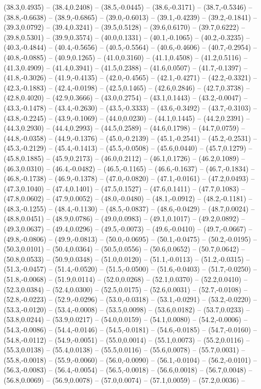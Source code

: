 \documentclass{SVnote}
\begin{document}
(38.3,0.4935) -- (38.4,0.2408) -- (38.5,-0.0445) -- (38.6,-0.3171) -- (38.7,-0.5346) -- (38.8,-0.6638) -- (38.9,-0.6865) -- (39.0,-0.6013) -- (39.1,-0.4239) -- (39.2,-0.1841) -- (39.3,0.0792) -- (39.4,0.3241) -- (39.5,0.5128) -- (39.6,0.6170) -- (39.7,0.6222) -- (39.8,0.5301) -- (39.9,0.3574) -- (40.0,0.1331) -- (40.1,-0.1065) -- (40.2,-0.3235) -- (40.3,-0.4844) -- (40.4,-0.5656) -- (40.5,-0.5564) -- (40.6,-0.4606) -- (40.7,-0.2954) -- (40.8,-0.0885) -- (40.9,0.1265) -- (41.0,0.3160) -- (41.1,0.4508) -- (41.2,0.5116) -- (41.3,0.4909) -- (41.4,0.3941) -- (41.5,0.2388) -- (41.6,0.0507) -- (41.7,-0.1397) -- (41.8,-0.3026) -- (41.9,-0.4135) -- (42.0,-0.4565) -- (42.1,-0.4271) -- (42.2,-0.3321) -- (42.3,-0.1883) -- (42.4,-0.0198) -- (42.5,0.1465) -- (42.6,0.2846) -- (42.7,0.3738) -- (42.8,0.4020) -- (42.9,0.3666) -- (43.0,0.2754) -- (43.1,0.1443) -- (43.2,-0.0047) -- (43.3,-0.1478) -- (43.4,-0.2630) -- (43.5,-0.3333) -- (43.6,-0.3492) -- (43.7,-0.3103) -- (43.8,-0.2245) -- (43.9,-0.1069) -- (44.0,0.0230) -- (44.1,0.1445) -- (44.2,0.2391) -- (44.3,0.2930) -- (44.4,0.2993) -- (44.5,0.2589) -- (44.6,0.1798) -- (44.7,0.0759) -- (44.8,-0.0358) -- (44.9,-0.1376) -- (45.0,-0.2139) -- (45.1,-0.2541) -- (45.2,-0.2531) -- (45.3,-0.2129) -- (45.4,-0.1413) -- (45.5,-0.0508) -- (45.6,0.0440) -- (45.7,0.1279) -- (45.8,0.1885) -- (45.9,0.2173) -- (46.0,0.2112) -- (46.1,0.1726) -- (46.2,0.1089) -- (46.3,0.0310) -- (46.4,-0.0482) -- (46.5,-0.1165) -- (46.6,-0.1637) -- (46.7,-0.1834) -- (46.8,-0.1738) -- (46.9,-0.1378) -- (47.0,-0.0820) -- (47.1,-0.0161) -- (47.2,0.0493) -- (47.3,0.1040) -- (47.4,0.1401) -- (47.5,0.1527) -- (47.6,0.1411) -- (47.7,0.1083) -- (47.8,0.0602) -- (47.9,0.0052) -- (48.0,-0.0480) -- (48.1,-0.0912) -- (48.2,-0.1181) -- (48.3,-0.1255) -- (48.4,-0.1130) -- (48.5,-0.0837) -- (48.6,-0.0429) -- (48.7,0.0024) -- (48.8,0.0451) -- (48.9,0.0786) -- (49.0,0.0983) -- (49.1,0.1017) -- (49.2,0.0892) -- (49.3,0.0637) -- (49.4,0.0296) -- (49.5,-0.0073) -- (49.6,-0.0410) -- (49.7,-0.0667) -- (49.8,-0.0806) -- (49.9,-0.0813) -- (50.0,-0.0695) -- (50.1,-0.0475) -- (50.2,-0.0195) -- (50.3,0.0101) -- (50.4,0.0364) -- (50.5,0.0556) -- (50.6,0.0652) -- (50.7,0.0642) -- (50.8,0.0533) -- (50.9,0.0348) -- (51.0,0.0120) -- (51.1,-0.0113) -- (51.2,-0.0315) -- (51.3,-0.0457) -- (51.4,-0.0520) -- (51.5,-0.0500) -- (51.6,-0.0403) -- (51.7,-0.0250) -- (51.8,-0.0068) -- (51.9,0.0114) -- (52.0,0.0268) -- (52.1,0.0370) -- (52.2,0.0410) -- (52.3,0.0384) -- (52.4,0.0300) -- (52.5,0.0175) -- (52.6,0.0031) -- (52.7,-0.0108) -- (52.8,-0.0223) -- (52.9,-0.0296) -- (53.0,-0.0318) -- (53.1,-0.0291) -- (53.2,-0.0220) -- (53.3,-0.0120) -- (53.4,-0.0008) -- (53.5,0.0098) -- (53.6,0.0182) -- (53.7,0.0233) -- (53.8,0.0244) -- (53.9,0.0217) -- (54.0,0.0159) -- (54.1,0.0080) -- (54.2,-0.0006) -- (54.3,-0.0086) -- (54.4,-0.0146) -- (54.5,-0.0181) -- (54.6,-0.0185) -- (54.7,-0.0160) -- (54.8,-0.0112) -- (54.9,-0.0051) -- (55.0,0.0014) -- (55.1,0.0073) -- (55.2,0.0116) -- (55.3,0.0138) -- (55.4,0.0138) -- (55.5,0.0116) -- (55.6,0.0078) -- (55.7,0.0031) -- (55.8,-0.0018) -- (55.9,-0.0060) -- (56.0,-0.0090) -- (56.1,-0.0104) -- (56.2,-0.0101) -- (56.3,-0.0083) -- (56.4,-0.0054) -- (56.5,-0.0018) -- (56.6,0.0018) -- (56.7,0.0048) -- (56.8,0.0069) -- (56.9,0.0078) -- (57.0,0.0074) -- (57.1,0.0059) -- (57.2,0.0036) -- 
\end{document}
